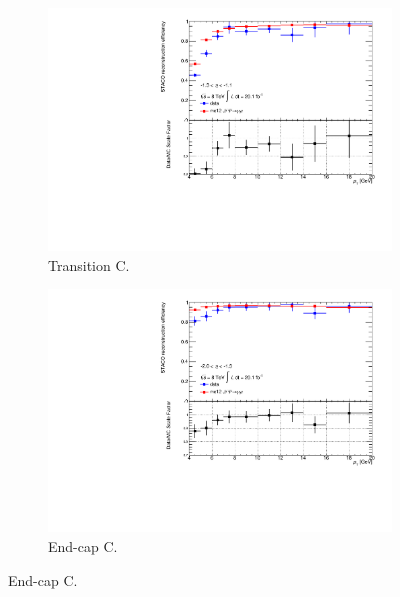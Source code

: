\begin{figure}[htbp]
    \begin{subfigure}[b]{0.45\textwidth}
      \includegraphics[width=\textwidth]{PartCalibration2012/Plots/SFPlots/Transition_C_reco.pdf}
      \caption{Transition C.}\label{fig:CalibrationRecoSFTransitionC}
    \end{subfigure}
    \hfill
    \begin{subfigure}[b]{0.45\textwidth}
      \includegraphics[width=\textwidth]{PartCalibration2012/Plots/SFPlots/Endcap_C_reco.pdf}
      \caption{End-cap C.}\label{fig:CalibrationRecoSFEndcapC}
    \end{subfigure}


\end{figure}
